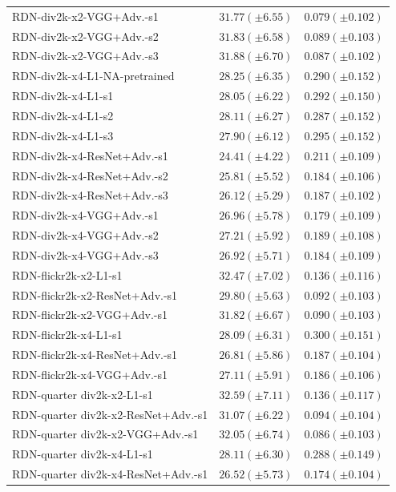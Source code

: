 \documentclass[10pt]{article} %
\begin{document}
\begin{longtable}{| p{} | p{} | p{} |}
RDN-div2k-x2-VGG+Adv.-s1 & $31.77 (\pm 6.55)$ & $0.079 (\pm 0.102)$ \\
RDN-div2k-x2-VGG+Adv.-s2 & $31.83 (\pm 6.58)$ & $0.089 (\pm 0.103)$ \\
RDN-div2k-x2-VGG+Adv.-s3 & $31.88 (\pm 6.70)$ & $0.087 (\pm 0.102)$ \\
RDN-div2k-x4-L1-NA-pretrained & $28.25 (\pm 6.35)$ & $0.290 (\pm 0.152)$ \\
RDN-div2k-x4-L1-s1 & $28.05 (\pm 6.22)$ & $0.292 (\pm 0.150)$ \\
RDN-div2k-x4-L1-s2 & $28.11 (\pm 6.27)$ & $0.287 (\pm 0.152)$ \\
RDN-div2k-x4-L1-s3 & $27.90 (\pm 6.12)$ & $0.295 (\pm 0.152)$ \\
RDN-div2k-x4-ResNet+Adv.-s1 & $24.41 (\pm 4.22)$ & $0.211 (\pm 0.109)$ \\
RDN-div2k-x4-ResNet+Adv.-s2 & $25.81 (\pm 5.52)$ & $0.184 (\pm 0.106)$ \\
RDN-div2k-x4-ResNet+Adv.-s3 & $26.12 (\pm 5.29)$ & $0.187 (\pm 0.102)$ \\
RDN-div2k-x4-VGG+Adv.-s1 & $26.96 (\pm 5.78)$ & $0.179 (\pm 0.109)$ \\
RDN-div2k-x4-VGG+Adv.-s2 & $27.21 (\pm 5.92)$ & $0.189 (\pm 0.108)$ \\
RDN-div2k-x4-VGG+Adv.-s3 & $26.92 (\pm 5.71)$ & $0.184 (\pm 0.109)$ \\
RDN-flickr2k-x2-L1-s1 & $32.47 (\pm 7.02)$ & $0.136 (\pm 0.116)$ \\
RDN-flickr2k-x2-ResNet+Adv.-s1 & $29.80 (\pm 5.63)$ & $0.092 (\pm 0.103)$ \\
RDN-flickr2k-x2-VGG+Adv.-s1 & $31.82 (\pm 6.67)$ & $0.090 (\pm 0.103)$ \\
RDN-flickr2k-x4-L1-s1 & $28.09 (\pm 6.31)$ & $0.300 (\pm 0.151)$ \\
RDN-flickr2k-x4-ResNet+Adv.-s1 & $26.81 (\pm 5.86)$ & $0.187 (\pm 0.104)$ \\
RDN-flickr2k-x4-VGG+Adv.-s1 & $27.11 (\pm 5.91)$ & $0.186 (\pm 0.106)$ \\
RDN-quarter div2k-x2-L1-s1 & $32.59 (\pm 7.11)$ & $0.136 (\pm 0.117)$ \\
RDN-quarter div2k-x2-ResNet+Adv.-s1 & $31.07 (\pm 6.22)$ & $0.094 (\pm 0.104)$ \\
RDN-quarter div2k-x2-VGG+Adv.-s1 & $32.05 (\pm 6.74)$ & $0.086 (\pm 0.103)$ \\
RDN-quarter div2k-x4-L1-s1 & $28.11 (\pm 6.30)$ & $0.288 (\pm 0.149)$ \\
RDN-quarter div2k-x4-ResNet+Adv.-s1 & $26.52 (\pm 5.73)$ & $0.174 (\pm 0.104)$ \\

\end{longtable}
\end{document}
